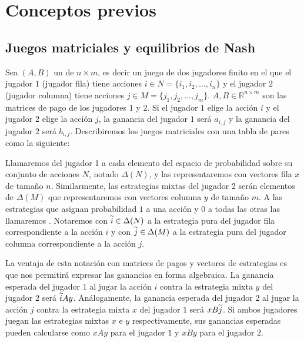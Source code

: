 \chapter{Conceptos previos}  \label{cap:previos}


\section{Juegos matriciales y equilibrios de Nash}

Sea $(A, B)$ un  de $n \times m$, es decir un juego de dos jugadores finito en el que el jugador $1$ (jugador fila) tiene acciones $i \in N = \{i_1, i_2, \dots, i_n\}$ y el jugador $2$ (jugador columna) tiene acciones $j \in M = \{j_1, j_2, \dots, j_m\}$. $A, B \in \mathbb{R}^{n \times m}$ son las matrices de pago de los jugadores $1$ y $2$. Si el jugador $1$ elige la acción $i$ y el jugador $2$ elige la acción $j$, la ganancia del jugador $1$ será $a_{i,j}$ y la ganancia del jugador $2$ será $b_{i,j}$. Describiremos los juegos matriciales con una tabla de pares como la siguiente:



Llamaremos  del jugador 1 a cada elemento del espacio de probabilidad sobre su conjunto de acciones $N$, notado $\Delta(N)$, y las representaremos con vectores fila $x$ de tamaño $n$. Similarmente, las estrategias mixtas del jugador 2 serán elementos de $\Delta(M)$ que representaremos con vectores columna $y$ de tamaño $m$. A las estrategias que asignan probabilidad $1$ a una acción y $0$ a todas las otras las llamaremos . Notaremos con $\widetilde{i}\in \Delta(N)$ a la estrategia pura del jugador fila correspondiente a la acción $i$ y con $\widetilde{j}\in \Delta(M)$ a la estrategia pura del jugador columna correspondiente a la acción $j$.

La ventaja de esta notación con matrices de pagos y vectores de estrategias es que nos permitirá expresar las ganancias en forma algebraica. La ganancia esperada del jugador $1$ al jugar la acción $i$ contra la estrategia mixta $y$ del jugador $2$ será $\widetilde{i}Ay$. Análogamente, la ganancia esperada del jugador $2$ al jugar la acción $j$ contra la estrategia mixta $x$ del jugador $1$ será $xB\widetilde{j}$. Si ambos jugadores juegan las estrategias mixtas $x$ e $y$ respectivamente, sus ganancias esperadas pueden calcularse como $xAy$ para el jugador $1$ y $xBy$ para el jugador $2$.

